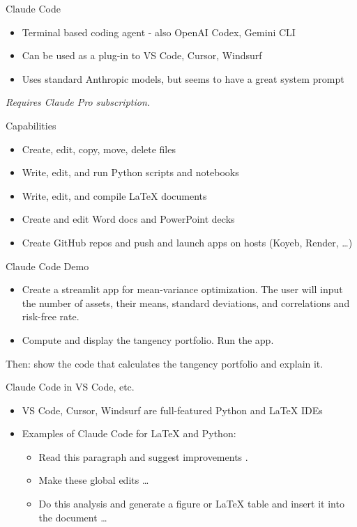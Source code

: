 \documentclass[
  ignorenonframetext,
]{beamer}
\providecommand{\tightlist}{%
  \setlength{\itemsep}{0pt}\setlength{\parskip}{0pt}}
\begin{document}
\begin{frame}{Claude Code}
\label{claude-code}
\begin{itemize}
\tightlist
\item
  Terminal based coding agent - also OpenAI Codex, Gemini CLI
\item
  Can be used as a plug-in to VS Code, Cursor, Windsurf
\item
  Uses standard Anthropic models, but seems to have a great system
  prompt
\end{itemize}

\emph{Requires Claude Pro subscription.}
\end{frame}

\begin{frame}{Capabilities}
\label{capabilities}
\begin{itemize}
\tightlist
\item
  Create, edit, copy, move, delete files
\item
  Write, edit, and run Python scripts and notebooks
\item
  Write, edit, and compile LaTeX documents
\item
  Create and edit Word docs and PowerPoint decks
\item
  Create GitHub repos and push and launch apps on hosts (Koyeb, Render,
  \ldots)
\end{itemize}
\end{frame}

\begin{frame}{Claude Code Demo}
\label{claude-code-demo}
\begin{itemize}
\tightlist
\item
  Create a streamlit app for mean-variance optimization. The user will
  input the number of assets, their means, standard deviations, and
  correlations and risk-free rate.
\item
  Compute and display the tangency portfolio. Run the app.
\end{itemize}

Then: show the code that calculates the tangency portfolio and explain
it.
\end{frame}

\begin{frame}{Claude Code in VS Code, etc.}
\label{claude-code-in-vs-code-etc.}
\begin{itemize}
\tightlist
\item
  VS Code, Cursor, Windsurf are full-featured Python and LaTeX IDEs
\item
  Examples of Claude Code for LaTeX and Python:

  \begin{itemize}
  \tightlist
  \item
    Read this paragraph and suggest improvements .
  \item
    Make these global edits \ldots{}
  \item
    Do this analysis and generate a figure or LaTeX table and insert it
    into the document \ldots{}
  \end{itemize}
\end{itemize}
\end{frame}
\end{document}
